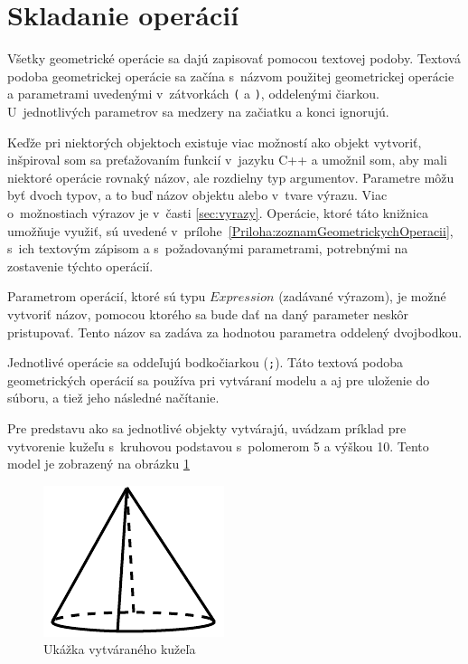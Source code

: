 \section{Skladanie operácií}
\label{sec:skladanie}
Všetky geometrické operácie sa dajú zapisovať pomocou textovej podoby. 
Textová podoba geometrickej operácie sa začína s~názvom použitej geometrickej operácie a parametrami uvedenými v~zátvorkách \texttt{(} a \texttt{)}, oddelenými čiarkou. U~jednotlivých parametrov sa medzery na začiatku a konci ignorujú.

 Keďže pri niektorých objektoch existuje viac možností ako objekt vytvoriť, inšpiroval som sa preťažovaním funkcií v~jazyku C++ a umožnil som, aby mali niektoré operácie rovnaký názov, ale rozdielny typ argumentov. Parametre môžu byť dvoch typov, a to buď názov objektu alebo v~tvare výrazu. Viac o~možnostiach výrazov je v~časti \ref{sec:vyrazy}. Operácie, ktoré táto knižnica umožňuje využiť, sú uvedené v~prílohe~\ref{Priloha:zoznamGeometrickychOperacii}, s~ich textovým zápisom a s~požadovanými parametrami, potrebnými na zostavenie týchto operácií.

Parametrom operácií, ktoré sú typu $Expression$ (zadávané výrazom), je možné vytvoriť názov, pomocou ktorého sa bude dať na daný parameter neskôr pristupovať. 
Tento názov sa zadáva za hodnotou parametra oddelený dvojbodkou.

Jednotlivé operácie sa oddeľujú bodkočiarkou (\texttt{;}). 
Táto textová podoba geometrických operácií sa používa pri vytváraní modelu a aj pre uloženie do súboru, a tiež jeho následné načítanie.

Pre predstavu ako sa jednotlivé objekty vytvárajú, uvádzam príklad pre vytvorenie kužeľu s~kruhovou podstavou s~polomerom 5 a výškou 10. Tento model je zobrazený na obrázku \ref{fig:Cone}
\begin{figure}[H]
	\centering
	\includegraphics[height=0.3\textwidth]{obrazky-figures/Examples/Cone.pdf}
	\caption{Ukážka vytváraného kužeľa}
	\label{fig:Cone}
\end{figure}

